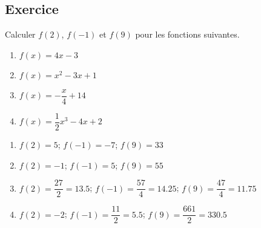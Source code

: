 \documentclass[a4paper,11pt]{article}
\begin{document}
\subsection{Exercice}
Calculer $f(2)$, $f(-1)$ et $f(9)$ pour les fonctions suivantes.
\begin{multicols}{2}
\begin{enumerate}
\item $f(x)=4x-3$
\item $f(x)=x^2-3x+1$
\item $f(x)=-\dfrac{x}{4}+14$
\item $f(x)=\dfrac{1}{2}x^3-4x+2$
\end{enumerate}
\end{multicols}

\begin{solution}
\begin{enumerate}
\item $f(2)=5$; $f(-1)=-7$; $f(9)=33$
\item $f(2)=-1$; $f(-1)=5$; $f(9)=55$
\item $f(2)=\dfrac{27}{2}=13.5$; $f(-1)=\dfrac{57}{4}=14.25$; $f(9)=\dfrac{47}{4}=11.75$
\item $f(2)=-2$; $f(-1)=\dfrac{11}{2}=5.5$; $f(9)=\dfrac{661}{2}=330.5$
\end{enumerate}

\end{solution}
\end{document}
